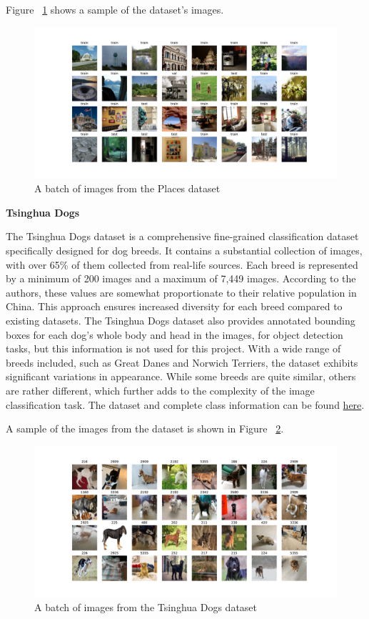 \documentclass[a4paper,11pt,openright]{book}
\begin{document}
Figure ~\ref{fig:places} shows a sample of the dataset's images.

\begin{figure}[!htb]
    \centering
    \includegraphics[width=1\textwidth]{images/places256.pdf}
    \caption{A batch of images from the Places dataset}
    \label{fig:places}
\end{figure}


\textbf{Tsinghua Dogs}

The Tsinghua Dogs dataset \cite{zouNewDatasetDog2020} is a comprehensive fine-grained classification dataset specifically designed for dog breeds. It contains a substantial collection of images, with over 65\% of them collected from real-life sources. Each breed is represented by a minimum of 200 images and a maximum of 7,449 images. According to the authors, these values are somewhat proportionate to their relative population in China. This approach ensures increased diversity for each breed compared to existing datasets. The Tsinghua Dogs dataset also provides annotated bounding boxes for each dog's whole body and head in the images, for object detection tasks, but this information is not used for this project. With a wide range of breeds included, such as Great Danes and Norwich Terriers, the dataset exhibits significant variations in appearance. While some breeds are quite similar, others are rather different, which further adds to the complexity of the image classification task. 
The dataset and complete class information can be found \href{https://cg.cs.tsinghua.edu.cn/ThuDogs/}{here}.

A sample of the images from the dataset is shown in Figure ~\ref{fig:tsing}.

\begin{figure}[!htb]
    \centering
    \includegraphics[width=1\textwidth]{images/tsing.pdf}
    \caption{A batch of images from the Tsinghua Dogs dataset}
    \label{fig:tsing}
\end{figure}
\end{document}
